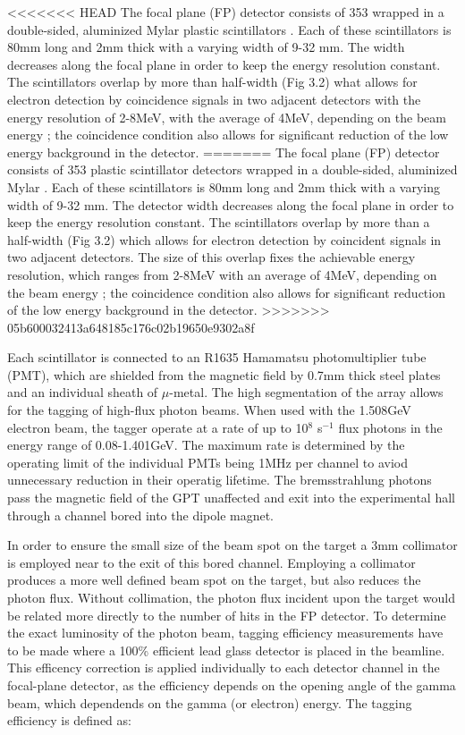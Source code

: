 <<<<<<< HEAD
\indent The focal plane (FP) detector consists of 353 wrapped in a double-sided, aluminized Mylar plastic scintillators \cite{sjhall}. Each of these scintillators is 80mm long and 2mm thick with a varying width of 9-32 mm. The width decreases along the focal plane in order to keep the energy resolution constant. The scintillators overlap by more than half-width (Fig 3.2) what allows for electron detection by coincidence signals in two adjacent detectors with the energy resolution of 2-8MeV, with the average of 4MeV, depending on the beam energy \cite{mcgeorge}; the coincidence condition also allows for significant reduction of the low energy background in the detector.
=======
\indent The focal plane (FP) detector consists of 353 plastic scintillator detectors wrapped in a double-sided, aluminized Mylar \cite{sjhall}. Each of these scintillators is 80mm long and 2mm thick with a varying width of 9-32 mm. The detector width decreases along the focal plane in order to keep the energy resolution constant. The scintillators overlap by more than a half-width (Fig 3.2) which allows for electron detection by coincident signals in two adjacent detectors. The size of this overlap fixes the achievable energy resolution, which ranges from 2-8MeV with an average of 4MeV, depending on the beam energy \cite{mcgeorge}; the coincidence condition also allows for significant reduction of the low energy background in the detector.
>>>>>>> 05b600032413a648185c176c02b19650e9302a8f

\indent Each scintillator is connected to an R1635 Hamamatsu photomultiplier tube (PMT), which are shielded from the magnetic field by 0.7mm thick steel plates and an individual sheath of $\mu$-metal. The high segmentation of the array allows for the tagging of high-flux photon beams. When used with the 1.508GeV electron beam, the tagger operate at a rate of up to 10$^{8}$ s$^{-1}$ flux photons in the energy range of 0.08-1.401GeV. The maximum rate is determined by the operating limit of the individual PMTs being 1MHz per channel to aviod unnecessary reduction in their operatig lifetime. The bremsstrahlung photons pass the magnetic field of the GPT unaffected and exit into the experimental hall through a channel bored into the dipole magnet.

\indent In order to ensure the small size of the beam spot on the target a 3mm collimator is employed near to the exit of this bored channel. Employing a collimator produces a more well defined beam spot on the target, but also reduces the photon flux.  Without collimation, the photon flux incident upon the target would be related more directly to the number of hits in the FP detector. To determine the exact luminosity of the photon beam, tagging efficiency measurements have to be made where a 100\% efficient lead glass detector is placed in the beamline.  This efficency correction is applied individually to each detector channel in the focal-plane detector, as the efficiency depends on the opening angle of the gamma beam, which dependends on the gamma (or electron) energy. The tagging efficiency is defined as:

